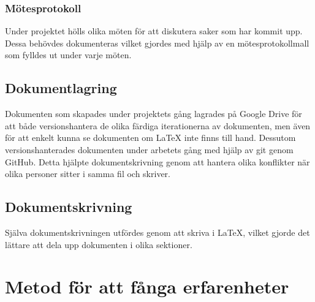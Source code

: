 \subsubsection*{Mötesprotokoll}
Under projektet hölls olika möten för att diskutera saker som har kommit upp. Dessa behövdes dokumenteras vilket gjordes med hjälp av en mötesprotokollmall som fylldes ut under varje möten.

\subsection{Dokumentlagring}
Dokumenten som skapades under projektets gång lagrades på Google Drive för att både versionshantera de olika färdiga iterationerna av dokumenten, men även för att enkelt kunna se dokumenten om LaTeX inte finns till hand. Dessutom versionshanterades dokumenten under arbetets gång med hjälp av git genom GitHub. Detta hjälpte dokumentskrivning genom att hantera olika konflikter när olika personer sitter i samma fil och skriver. 

\subsection{Dokumentskrivning}
Själva dokumentskrivningen utfördes genom att skriva i LaTeX, vilket gjorde det lättare att dela upp dokumenten i olika sektioner.   

\section{Metod för att fånga erfarenheter}




